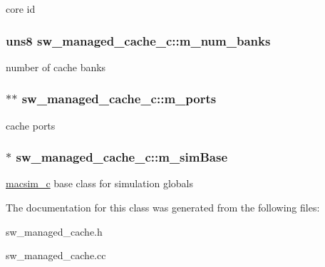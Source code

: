 \label{classsw__managed__cache__c_a8151061bd7add9729c93ce0d03148ed6}
core id \hypertarget{classsw__managed__cache__c_a5487418d498c1f5518e44f35c4e0e6c4}{
\subsubsection[{m\_\-num\_\-banks}]{\setlength{\rightskip}{0pt plus 5cm}uns8 {\bf sw\_\-managed\_\-cache\_\-c::m\_\-num\_\-banks}}}
\label{classsw__managed__cache__c_a5487418d498c1f5518e44f35c4e0e6c4}
number of cache banks \hypertarget{classsw__managed__cache__c_ab27c8a03c50b7e51d6867b980115588b}{
\subsubsection[{m\_\-ports}]{$\ast$$\ast$ {\bf sw\_\-managed\_\-cache\_\-c::m\_\-ports}}}
\label{classsw__managed__cache__c_ab27c8a03c50b7e51d6867b980115588b}
cache ports \hypertarget{classsw__managed__cache__c_a262d7f694fb4b947870a364b7eb42026}{
\subsubsection[{m\_\-simBase}]{$\ast$ {\bf sw\_\-managed\_\-cache\_\-c::m\_\-simBase}}}
\label{classsw__managed__cache__c_a262d7f694fb4b947870a364b7eb42026}
\hyperlink{classmacsim__c}{macsim\_\-c} base class for simulation globals 

The documentation for this class was generated from the following files:\begin{DoxyCompactItemize}
\item 
sw\_\-managed\_\-cache.h\item 
sw\_\-managed\_\-cache.cc\end{DoxyCompactItemize}
